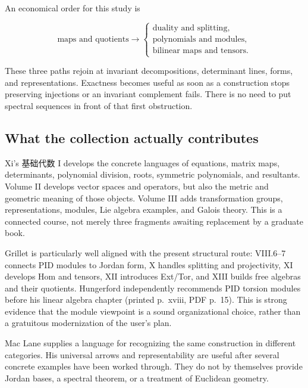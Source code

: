\documentclass[
  11pt,
]{article}
\newcommand{\CJKtext}[1]{{\cjkfont #1}}
\begin{document}
An economical order for this study is

\[
\text{maps and quotients}\longrightarrow
\begin{cases}
\text{duality and splitting},\\
\text{polynomials and modules},\\
\text{bilinear maps and tensors}.
\end{cases}
\]

These three paths rejoin at invariant decompositions, determinant lines,
forms, and representations. Exactness becomes useful as soon as a
construction stops preserving injections or an invariant complement
fails. There is no need to put spectral sequences in front of that first
obstruction.

\subsection*{What the collection actually
contributes}\label{what-the-collection-actually-contributes}

Xi's \CJKtext{基础代数} I develops the concrete languages of equations,
matrix maps, determinants, polynomial division, roots, symmetric
polynomials, and resultants. Volume II develops vector spaces and
operators, but also the metric and geometric meaning of those objects.
Volume III adds transformation groups, representations, modules, Lie
algebra examples, and Galois theory. This is a connected course, not
merely three fragments awaiting replacement by a graduate book.

Grillet is particularly well aligned with the present structural route:
VIII.6--7 connects PID modules to Jordan form, X handles splitting and
projectivity, XI develops Hom and tensors, XII introduces Ext/Tor, and
XIII builds free algebras and their quotients. Hungerford independently
recommends PID torsion modules before his linear algebra chapter
(printed p.~xviii, PDF p.~15). This is strong evidence that the module
viewpoint is a sound organizational choice, rather than a gratuitous
modernization of the user's plan.

Mac Lane supplies a language for recognizing the same construction in
different categories. His universal arrows and representability are
useful after several concrete examples have been worked through. They do
not by themselves provide Jordan bases, a spectral theorem, or a
treatment of Euclidean geometry.
\end{document}

